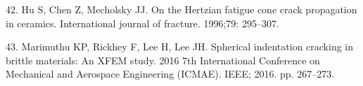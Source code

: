 \documentclass[10pt,letterpaper]{article}
\newenvironment{cslreferences}%
  {}%
  {\par}
\begin{document}
\begin{cslreferences}
\leavevmode\hypertarget{ref-hu_hertzian_1996}{}%
42. Hu S, Chen Z, Mecholsky JJ. On the Hertzian fatigue cone crack
propagation in ceramics. International journal of fracture. 1996;79:
295--307.

\leavevmode\hypertarget{ref-marimuthu_spherical_2016}{}%
43. Marimuthu KP, Rickhey F, Lee H, Lee JH. Spherical indentation
cracking in brittle materials: An XFEM study. 2016 7th International
Conference on Mechanical and Aerospace Engineering (ICMAE). IEEE; 2016.
pp. 267--273.
\end{cslreferences}

\nolinenumbers
\end{document}
